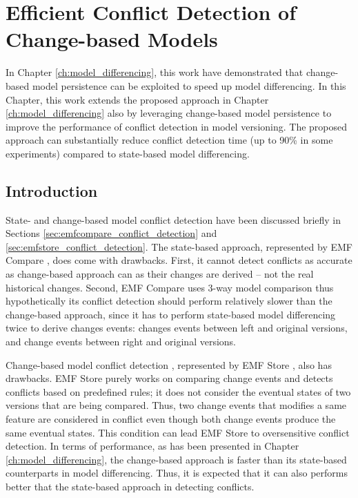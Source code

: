 \chapter{Efficient Conflict Detection of Change-based Models}
\label{ch:conflict_detection}
  
In Chapter \ref{ch:model_differencing}, this work have demonstrated that  change-based model persistence can be exploited to speed up model differencing. In this Chapter, this work extends the proposed approach in Chapter \ref{ch:model_differencing} also by leveraging change-based model persistence to improve the performance of conflict detection in model versioning. The proposed approach can substantially reduce conflict detection time (up to 90\% in some experiments) compared to state-based model differencing. 

\section{Introduction}
\label{sec:introduction_7}
State- and change-based model conflict detection have been discussed briefly in Sections \ref{sec:emfcompare_conflict_detection} and \ref{sec:emfstore_conflict_detection}. The state-based approach, represented by EMF Compare \cite{emfcompare2018developer}, does come with drawbacks. First, it cannot detect conflicts as accurate as change-based approach can as their changes are derived -- not the real historical changes. Second, EMF Compare uses 3-way model comparison \cite{emfcompare2018developer} thus hypothetically its conflict detection should perform relatively slower than the change-based approach, since it has to perform state-based model differencing twice to derive changes events: changes events between left and original versions, and change events between right and original versions. 

Change-based model conflict detection \cite{koegel2010operation}, represented by EMF Store \cite{emfstore2019what}, also has drawbacks. EMF Store purely works on comparing change events and detects conflicts based on predefined rules; it does not consider the eventual states of two versions that are being compared. Thus, two change events that modifies a same feature are considered in conflict even though both change events produce the same eventual states. This condition can lead EMF Store to oversensitive conflict detection. In terms of performance, as has been presented in Chapter \ref{ch:model_differencing}, the change-based approach is faster than its state-based counterparts in model differencing. Thus, it is expected that it can also performs better that the state-based approach in detecting conflicts.
 
